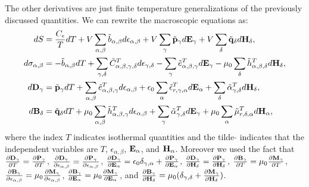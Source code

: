 \documentclass[12pt,a4paper,twoside]{report}
\begin{document}
The other derivatives are just finite temperature generalizations of the
previously discussed quantities. We can rewrite the macroscopic equations as:
\begin{align}
dS&= {C_\epsilon\over T} dT+ V \sum_{\alpha,\beta} \tilde b_{\alpha,\beta} 
d\epsilon_{\alpha,\beta}
+ V \sum_\gamma \tilde {\bf p}_\gamma d{\bf E}_{\gamma} +
V \sum_\delta \tilde {\bf q}_\delta d{\bf H}_{\delta}, \\
d\sigma_{\alpha,\beta}&= -\tilde b_{\alpha,\beta} dT + 
\sum_{\gamma,\delta} \tilde C^T_{\alpha,\beta,\gamma,\delta} 
d \epsilon_{\gamma,\delta} - \sum_\gamma \tilde e^T_{\alpha,\beta,\gamma} 
d{\bf E}_{\gamma} -\mu_0 
\sum_\delta \tilde h^T_{\alpha,\beta,\delta} d{\bf H}_{\delta}, \\
d{\bf D}_\gamma&=
\tilde {\bf p}_\gamma dT + \sum_{\alpha,\beta} \tilde 
e^T_{\alpha,\beta,\gamma} d\epsilon_{\alpha,\beta}
+\epsilon_0 \sum_\alpha \tilde \epsilon^T_{r,\gamma,\alpha} 
d{\bf E}_{\alpha} + 
\sum_\delta \tilde \alpha^T_{\gamma,\delta} d{\bf H}_{\delta}, 
\label{dsi} \\
d{\bf B}_\delta&=
\tilde {\bf q}_\delta dT+\mu_0 \sum_{\alpha,\beta}
\tilde h^T_{\alpha,\beta,\gamma}
d\epsilon_{\alpha,\beta}
+\sum_\gamma \tilde \alpha^T_{\gamma,\delta}
d{\bf E}_{\gamma}+ \mu_0
\sum_\alpha \tilde \mu^{T}_{r,\delta,\alpha}
d{\bf H}_{\alpha}, \label{bsi}
\end{align}
where the index $T$ indicates isothermal quantities and 
the tilde $\tilde{ }$ indicates that the independent variables are
$T$, $\epsilon_{\alpha,\beta}$, ${\bf E}_\alpha$, and ${\bf H}_\alpha$. 
Moreover we used the fact
that 
${\partial {\bf D}_\gamma \over \partial T} =
{\partial {\bf P}_\gamma \over \partial T}$,
${\partial {\bf D}_\gamma \over \partial \epsilon_{\alpha,\beta}}=
{\partial {\bf P}_\gamma \over \partial \epsilon_{\alpha,\beta}}$,
${\partial {\bf D}_\gamma \over \partial {\bf E}_{\alpha}}= \epsilon_0 
\delta_{\gamma,\alpha} +
{\partial {\bf P}_\gamma \over \partial {\bf E}_{\alpha}}$, 
${\partial {\bf D}_\gamma \over \partial {\bf H}_{\delta}}= 
{\partial {\bf P}_\gamma \over \partial {\bf H}_{\delta}}$, 
${\partial {\bf B}_\gamma \over \partial T} = \mu_0
{\partial {\bf M}_\gamma \over \partial T}$,
${\partial {\bf B}_\gamma \over \partial \epsilon_{\alpha,\beta}}= \mu_0
{\partial {\bf M}_\gamma \over \partial \epsilon_{\alpha,\beta}}$,
${\partial {\bf B}_\gamma \over \partial {\bf E}_{\alpha}}= \mu_0
{\partial {\bf M}_\gamma \over \partial {\bf E}_{\alpha}}$, and
${\partial {\bf B}_\gamma \over \partial {\bf H}_{\delta}}= \mu_0
(\delta_{\gamma,\delta} +
{\partial {\bf M}_\gamma \over \partial {\bf H}_{\delta}})$. 
\end{document}

